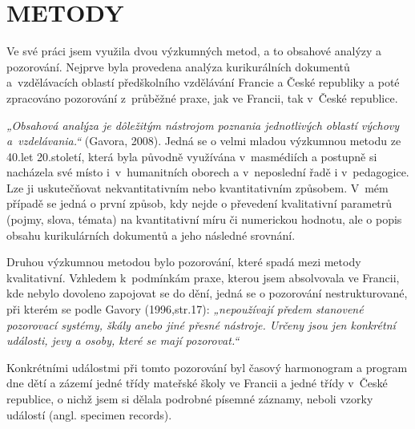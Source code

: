 
\chapter{METODY}

Ve své práci jsem využila dvou výzkumných metod, a to obsahové analýzy a pozorování. Nejprve byla provedena analýza kurikurálních dokumentů a vzdělávacích oblastí předškolního vzdělávání Francie a České republiky a poté zpracováno pozorování z průběžné praxe, jak ve Francii, tak v České republice.

\textit{„Obsahová analýza je dôležitým nástrojom poznania jednotlivých oblastí výchovy a vzdelávania.“ }(Gavora, 2008). Jedná se o velmi mladou výzkumnou metodu ze 40.let 20.století, která byla původně využívána v masmédiích a postupně si nacházela své místo i v humanitních oborech a v neposlední řadě i v pedagogice. Lze ji uskutečňovat nekvantitativním nebo kvantitativním způsobem. V mém případě se jedná o první způsob, kdy nejde o převedení kvalitativní parametrů (pojmy, slova, témata) na kvantitativní míru či numerickou hodnotu, ale o popis obsahu kurikulárních dokumentů a jeho následné srovnání. 

Druhou výzkumnou metodou bylo pozorování, které spadá mezi metody kvalitativní. Vzhledem k podmínkám praxe, kterou jsem absolvovala ve Francii, kde nebylo dovoleno zapojovat se do dění, jedná se o pozorování nestrukturované, při kterém se podle Gavory (1996,str.17): \textit{„nepoužívají předem stanovené pozorovací systémy, škály anebo jiné přesné nástroje. Určeny jsou jen konkrétní události, jevy a osoby, které se mají pozorovat.“} 

Konkrétními událostmi při tomto pozorování byl časový harmonogram a program dne dětí a zázemí jedné třídy mateřské školy ve Francii a jedné třídy v České republice, o nichž jsem si dělala podrobné písemné záznamy, neboli vzorky událostí (angl. specimen records). 

